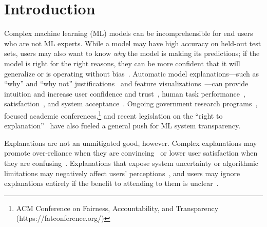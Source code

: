 \section{Introduction}
Complex machine learning (ML) models can be incomprehensible for end users who are not ML experts. While a model may have high accuracy on held-out test sets, users may also want to know {\em why} the model is making its predictions; if the model is right for the right reasons, they can be more confident that it will generalize or is operating without bias~\cite{Dodge2019ExplainingJudgment}. Automatic model explanations---such as ``why'' and ``why not'' justifications~\cite{Lim2009WhySystems} and feature visualizations~\cite{Kulesza2015PrinciplesLearning}---can provide intuition and increase user confidence and trust~\cite{Pu2006TrustInterfaces, Bunt2007UnderstandingCustomization}, human task performance~\cite{Stowers2017InsightsUncertainty, Feng2019WhatPlay,Schmidt2019QuantifyingSystems},  satisfaction~\cite{Biran2017Human-centricPredictions}, and system acceptance~\cite{Herlocker2000ExplainingRecommendations}. Ongoing government research programs~\cite{Gunning2016ExplainableXAI}, focused academic conferences,\footnote{ACM Conference on Fairness, Accountability, and Transparency (https://fatconference.org/)} and recent legislation on the ``right to explanation''~\cite{Goodman2017EuropeanExplanation} have also fueled a general push for ML system transparency. 

Explanations are not an unmitigated good, however. Complex explanations may promote over-reliance when they are convincing~\cite{Stumpf2016ExplanationsSystems} or lower user satisfaction when they are confusing~\cite{Narayanan2018HowExplanation}. Explanations that expose system uncertainty or algorithmic limitations may negatively affect users' perceptions~\cite{Lim2011InvestigatingApplications, Stowers2017InsightsUncertainty, Cai2019TheInterface}, and users may ignore explanations entirely if the benefit to attending to them is unclear~\cite{Kulesza2013TooModels}. 

